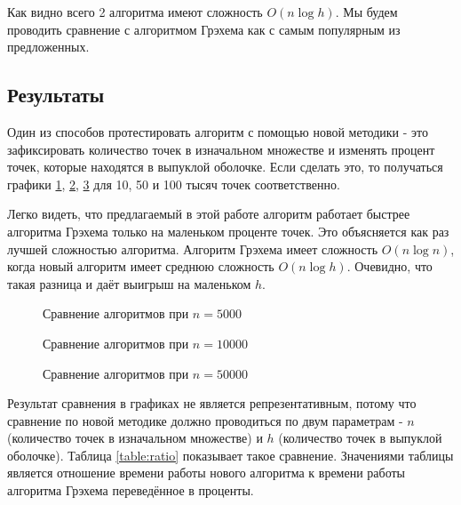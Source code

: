Как видно всего 2 алгоритма имеют сложность $O(n \log h)$. Мы будем проводить сравнение с алгоритмом Грэхема как с самым популярным из предложенных.

\subsection{Результаты}

Один из способов протестировать алгоритм с помощью новой методики - это зафиксировать количество точек в изначальном множестве и изменять процент точек, которые находятся в выпуклой оболочке. Если сделать это, то получаться графики \ref{img:comparison_5000}, \ref{img:comparison_10000}, \ref{img:comparison_50000} для 10, 50 и 100 тысяч точек соответственно.

Легко видеть, что предлагаемый в этой работе алгоритм работает быстрее алгоритма Грэхема только на маленьком проценте точек. Это объясняется как раз лучшей сложностью алгоритма. Алгоритм Грэхема имеет сложность $O(n \log n)$, когда новый алгоритм имеет среднюю сложность $O(n \log h)$. Очевидно, что такая разница и даёт выигрыш на маленьком $h$.

\begin{figure}[H]
	\centering
	
	\caption{Сравнение алгоритмов при $n = 5000$}
	\label{img:comparison_5000}
\end{figure}

\begin{figure}[H]
	\centering
	
	\caption{Сравнение алгоритмов при $n = 10000$}
	\label{img:comparison_10000}
\end{figure}

\begin{figure}[H]
	\centering
	
	\caption{Сравнение алгоритмов при $n = 50000$}
	\label{img:comparison_50000}
\end{figure}

Результат сравнения в графиках не является репрезентативным, потому что сравнение по новой методике должно проводиться по двум параметрам - $n$ (количество точек в изначальном множестве) и $h$ (количество точек в выпуклой оболочке). Таблица \ref{table:ratio} показывает такое сравнение. Значениями таблицы является отношение времени работы нового алгоритма к времени работы алгоритма Грэхема переведённое в проценты.


